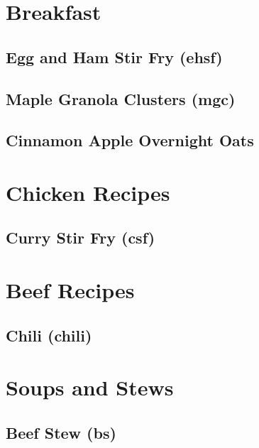 \documentclass{report}
\begin{document}
\tableofcontents


\chapter{Breakfast}

\section{Egg and Ham Stir Fry (ehsf)}

\newpage

\section{Maple Granola Clusters (mgc)}


\newpage
\section{Cinnamon Apple Overnight Oats}


\chapter{Chicken Recipes}
\newpage
\section{Curry Stir Fry (csf)}

 
\chapter{Beef Recipes}
\newpage
\section{Chili (chili)}

\newpage



\chapter{Soups and Stews}
\newpage 

\section{Beef Stew (bs)}

\newpage 
\end{document}
